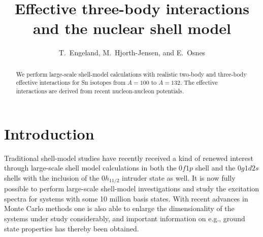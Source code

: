 
\draft



\title{Effective three-body interactions and the nuclear shell model}

\author{T.\ Engeland, M.\ Hjorth-Jensen, and E.\ Osnes}
 
\address{Department of Physics, University of Oslo, N-0316 Oslo, Norway}

\maketitle

\begin{abstract}

We perform large-scale shell-model calculations
with realistic two-body  and three-body effective interactions
for Sn isotopes from $A=100$ to $A=132$.
The effective interactions are derived from recent
nucleon-nucleon potentials. 

\end{abstract}




\section{Introduction}\label{sec:sec1}


Traditional shell-model studies 
have recently received a kind of renewed
interest through large-scale shell model calculations
in both the $0f1p$ shell and the $0g1d2s$ shells with
the inclusion of the $0h_{11/2}$ intruder state as well. 
It is now fully possible to perform large-scale 
shell-model investigations
and study the excitation spectra 
for systems with 
some 10 million basis states. With recent advances in
Monte Carlo methods one is also 
able to enlarge the dimensionality
of the systems under study considerably,
and important information on e.g., ground state properties
has thereby been obtained.

